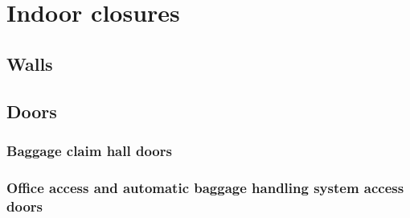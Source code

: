 \chapter{Indoor closures}
	
	\section{Walls}
	
	\section{Doors}
		\subsection{Baggage claim hall doors}
		\subsection{Office access and automatic baggage handling system access doors}
		
